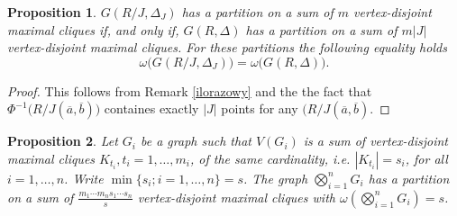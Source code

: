 \documentclass[12pt,a4paper]{article}
\newtheorem{prop}{Proposition}
\theoremstyle{definition}
\begin{document}
\begin{prop}\label{kliki.iloraz} 
$G(R/J, \Delta_J)$ has a partition on a sum of $m$ vertex-disjoint maximal cliques if, and only if, $G(R, \Delta)$ has a partition on a sum of $m|J|$ vertex-disjoint maximal cliques.  For these partitions the following equality holds
$$\omega\bigl(G(R/J, \Delta_J)\bigr)=\omega\bigl(G(R, \Delta)\bigr).$$
\end{prop}
\begin{proof}
This follows from Remark \ref{ilorazowy} and the the fact that $\Phi^{-1}\bigl(R/J(\overline a, \overline b)\bigr)$ containes exactly $|J|$ points  for any $(R/J(\overline a, \overline b)$.
\end{proof}

\begin{prop}\label{kliki.produkt}
Let $G_i$ be a graph such that $V(G_i)$ is a sum of vertex-disjoint maximal cliques $K_{t_i}, t_i=1, \ldots, m_i$, of the same cardinality, i.e. $|K_{t_i}|=s_i$, for all $i=1, \ldots, n$. Write $\min\{s_i; i=1, \ldots, n\}=s$. 
The graph $\bigotimes_{i=1}^nG_i$ has a partition on a sum of $\frac{m_1 \cdots m_ns_1\cdots s_n}{s}$ vertex-disjoint maximal cliques with $\omega(\bigotimes_{i=1}^nG_i)=s$.
\end{prop}
\end{document}
